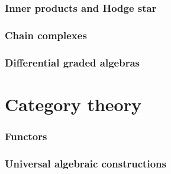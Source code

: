 \documentclass{article}
\theoremstyle{definition}
\begin{document}
\section{Inner products and Hodge star}
\label{section:inner_products_and_hodge_star}











\section{Chain complexes}
\label{section:chain_complexes}




\section{Differential graded algebras}
\label{section:differential_graded_algebras}




\part{Category theory}

\section{Functors}
\label{section:functors}


\section{Universal algebraic constructions}
\label{section:universal_algebraic_constructions}

\end{document}
